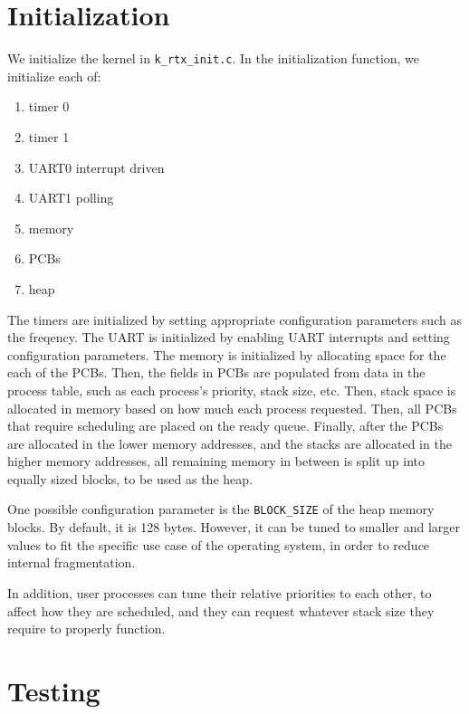 \documentclass[12pt]{report}
\begin{document}

\section{Initialization}

We initialize the kernel in \texttt{k\_rtx\_init.c}. In the initialization function, we initialize each of:
\begin{enumerate}
	\item timer 0
	\item timer 1
	\item UART0 interrupt driven
	\item UART1 polling
	\item memory
	\item PCBs
	\item heap 
\end{enumerate}

The timers are initialized by setting appropriate configuration parameters such as the freqency. The UART is initialized by enabling UART interrupts and setting configuration parameters. The memory is initialized by allocating space for the each of the PCBs. Then, the fields in PCBs are populated from data in the process table, such as each process's priority, stack size, etc. Then, stack space is allocated in memory based on how much each process requested. Then, all PCBs that require scheduling are placed on the ready queue. Finally, after the PCBs are allocated in the lower memory addresses, and the stacks are allocated in the higher memory addresses, all remaining memory in between is split up into equally sized blocks, to be used as the heap. 

One possible configuration parameter is the \texttt{BLOCK_SIZE} of the heap memory blocks. By default, it is 128 bytes. However, it can be tuned to smaller and larger values to fit the specific use case of the operating system, in order to reduce internal fragmentation.

In addition, user processes can tune their relative priorities to each other, to affect how they are scheduled, and they can request whatever stack size they require to properly function.

\section{Testing}
\end{document}
